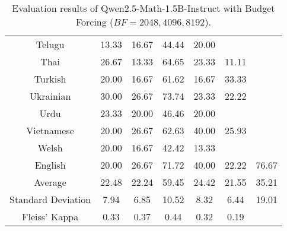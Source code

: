 \begin{table*}[]
\begin{tabular}{c|c|c|cccc}
Telugu & 13.33 & 16.67 & 44.44 & 20.00 & \multicolumn{1}{l}{} &  \\
Thai & 26.67 & 13.33 & 64.65 & 23.33 & 11.11 &  \\
Turkish & 20.00 & 16.67 & 61.62 & 16.67 & 33.33 &  \\
Ukrainian & 30.00 & 26.67 & 73.74 & 23.33 & 22.22 &  \\
Urdu & 23.33 & 20.00 & 46.46 & 20.00 & \multicolumn{1}{l}{} &  \\
Vietnamese & 20.00 & 26.67 & 62.63 & 40.00 & 25.93 &  \\
Welsh & 20.00 & 16.67 & 42.42 & 13.33 & \multicolumn{1}{l}{} &  \\
\rowcolor[HTML]{FCE5CD}English & 20.00 & 26.67 & 71.72 & 40.00 & 22.22 & 76.67 \\ \midrule
Average & 22.48 & 22.24 & 59.45 & 24.42 & 21.55 & 35.21 \\
Standard Deviation & 7.94 & 6.85 & 10.52 & 8.32 & 6.44 & 19.01 \\
Fleiss' Kappa & 0.33 & 0.37 & 0.44 & 0.32 & 0.19 & \\ \bottomrule
\end{tabular}
\caption{\footnotesize Evaluation results of Qwen2.5-Math-1.5B-Instruct with Budget Forcing (\(BF=2048, 4096, 8192\)).}
\label{tab:1_5B_bf}
\end{table*}

